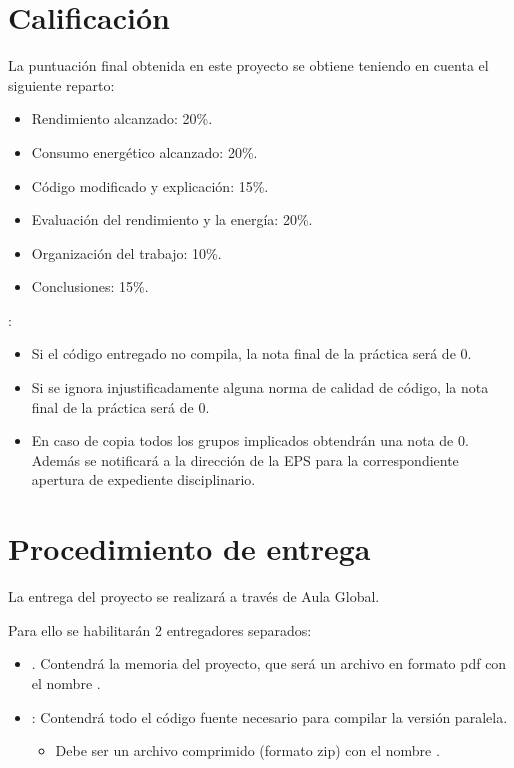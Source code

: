 \section{Calificación}

La puntuación final obtenida en este proyecto se obtiene teniendo en cuenta el siguiente reparto: 

\begin{itemize}
  \item Rendimiento alcanzado: 20\%.
  \item Consumo energético alcanzado: 20\%.
  \item Código modificado y explicación: 15\%.
  \item Evaluación del rendimiento y la energía: 20\%.
  \item Organización del trabajo: 10\%.
  \item Conclusiones: 15\%.
\end{itemize}

:

\begin{itemize}
  \item Si el código entregado no compila, la nota final de la práctica será de 0. 
  \item Si se ignora injustificadamente alguna norma de calidad de código,
        la nota final de la práctica será de 0.
  \item En caso de copia todos los grupos implicados obtendrán una nota de 0.
        Además se notificará a la dirección de la EPS para la correspondiente
        apertura de expediente disciplinario.
\end{itemize}

\section{Procedimiento de entrega}

La entrega del proyecto se realizará a través de Aula Global.

Para ello se habilitarán 2 entregadores separados:

\begin{itemize}

\item {}. Contendrá la memoria del proyecto, que será
un archivo en formato pdf con el nombre .

\item {}: Contendrá todo el código fuente
necesario para compilar la versión paralela.
\begin{itemize}
  \item Debe ser un archivo comprimido (formato zip) con el nombre
        .
\end{itemize}

\end{itemize}


